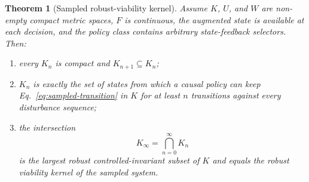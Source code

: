 \documentclass[11pt]{article}
\newtheorem{theorem}{Theorem}
\theoremstyle{definition}
\begin{document}
\begin{theorem}[Sampled robust-viability kernel]
\label{thm:sampled-viability}
Assume $K$, $U$, and $W$ are non-empty compact metric spaces, $F$ is continuous, the augmented state is available at each decision, and the policy class contains arbitrary state-feedback selectors. Then:

\begin{enumerate}
\item every $K_n$ is compact and $K_{n+1}\subseteq K_n$;
\item $K_n$ is exactly the set of states from which a causal policy can keep Eq.~\eqref{eq:sampled-transition} in $K$ for at least $n$ transitions against every disturbance sequence;
\item the intersection
\[
K_\infty=\bigcap_{n=0}^{\infty}K_n
\]
is the largest robust controlled-invariant subset of $K$ and equals the robust viability kernel of the sampled system.
\end{enumerate}
\end{theorem}
\end{document}
